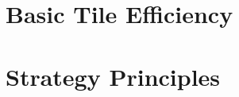 \documentclass{book}
\begin{document}

\part{Basic Tile Efficiency} \label{part:tile}






\part{Strategy Principles} \label{part:strat}








\begin{appendices}
\appendixpage \noappendicestocpagenum \addappheadtotoc




\end{appendices}

{\small \printindex}
\end{document}
